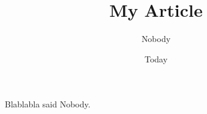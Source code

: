 \documentclass[11pt]{article}
\begin{document}
\title{My Article}
\author{Nobody}
\date{Today}
\maketitle

Blablabla said Nobody. \textcite{aea2004guiding}

\printbibliography
\end{document}
